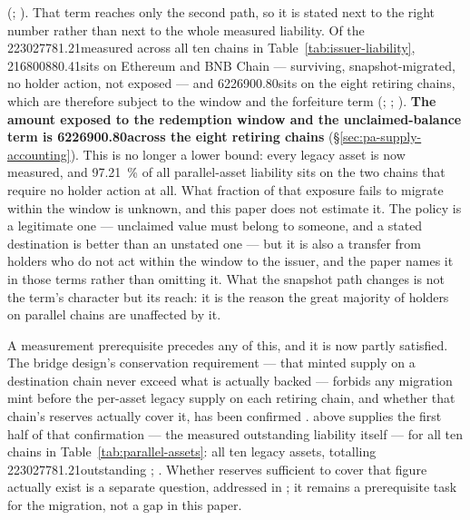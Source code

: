 (\planned; ). That term reaches only the second path, so
it is stated next to the right number rather than next to the whole measured liability. Of the
\num{223027781.21}\flux measured across all ten chains in
Table~\ref{tab:issuer-liability}, \num{216800880.41}\flux sits on Ethereum and BNB Chain — surviving,
snapshot-migrated, no holder action, not exposed — and \num{6226900.80}\flux sits on the eight
retiring chains, which are therefore subject to the
window and the forfeiture term (\shipped; ;
).
\textbf{The amount exposed to the redemption window and the unclaimed-balance term is
\num{6226900.80}\flux across the eight retiring chains} (\S\ref{sec:pa-supply-accounting}). This is
no longer a lower bound: every legacy asset is now measured, and \SI{97.21}{\percent} of all
parallel-asset liability sits on the two chains that require no holder action at all. What fraction of that exposure fails to migrate
within the window is unknown, and this paper does not estimate it. The policy is a legitimate one —
unclaimed value must belong to someone, and a stated destination is better than an unstated one — but
it is also a transfer from holders who do not act within the window to the issuer, and the paper
names it in those terms rather than omitting it. What the snapshot path changes is not the term's
character but its reach: it is the reason the great majority of \flux holders on parallel chains are
unaffected by it.

A measurement prerequisite precedes any of this, and it is now partly satisfied. The bridge design's
conservation requirement --- that minted supply on a destination chain never exceed what is actually
backed --- forbids any migration mint before the per-asset legacy supply on each retiring chain, and
whether that chain's reserves actually cover it, has been confirmed .
 above supplies the first half of that confirmation --- the measured
outstanding liability itself --- for all ten chains in Table~\ref{tab:parallel-assets}:
all ten legacy assets, totalling \num{223027781.21}\flux outstanding
\shipped {};
.
Whether reserves sufficient to cover that figure actually exist is a separate question, addressed in
; it remains a prerequisite task for the migration, not a gap in this
paper.

